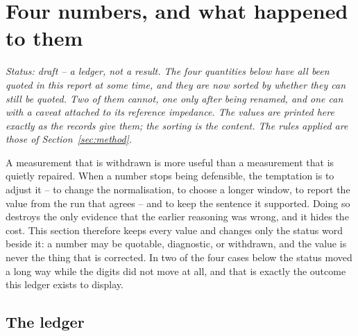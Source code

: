 \section{Four numbers, and what happened to them}
\label{sec:worked}

\noindent\emph{Status: draft -- a ledger, not a result. The four quantities below have all been quoted in this
report at some time, and they are now sorted by whether they can still be quoted. Two of them cannot, one only
after being renamed, and one can with a caveat attached to its reference impedance. The values are printed here
exactly as the records give them; the sorting is the content. The rules applied are those of
Section~\ref{sec:method}.}

A measurement that is withdrawn is more useful than a measurement that is quietly repaired. When a number stops
being defensible, the temptation is to adjust it -- to change the normalisation, to choose a longer window, to
report the value from the run that agrees -- and to keep the sentence it supported. Doing so destroys the only
evidence that the earlier reasoning was wrong, and it hides the cost. This section therefore keeps every value
and changes only the status word beside it: a number may be quotable, diagnostic, or withdrawn, and the value is
never the thing that is corrected. In two of the four cases below the status moved a long way while the digits
did not move at all, and that is exactly the outcome this ledger exists to display.

\subsection{The ledger}
\label{sec:worked-ledger}

